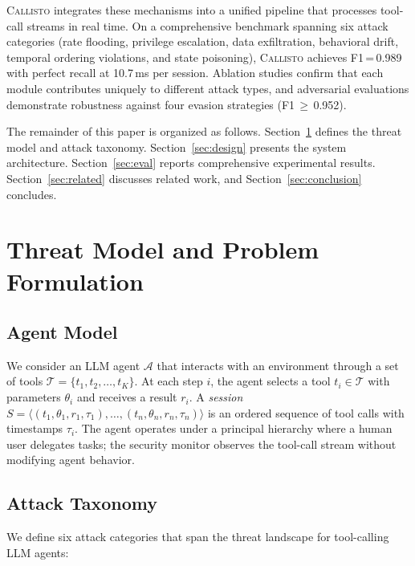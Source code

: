 \documentclass[conference,compsoc]{IEEEtran}
\newcommand{\system}{\textsc{Callisto}}
\begin{document}
\system{} integrates these mechanisms into a unified pipeline that processes tool-call streams in real time. On a comprehensive benchmark spanning six attack categories (rate flooding, privilege escalation, data exfiltration, behavioral drift, temporal ordering violations, and state poisoning), \system{} achieves F1\,=\,0.989 with perfect recall at 10.7\,ms per session. Ablation studies confirm that each module contributes uniquely to different attack types, and adversarial evaluations demonstrate robustness against four evasion strategies (F1\,$\geq$\,0.952).

The remainder of this paper is organized as follows. Section~\ref{sec:threat} defines the threat model and attack taxonomy. Section~\ref{sec:design} presents the system architecture. Section~\ref{sec:eval} reports comprehensive experimental results. Section~\ref{sec:related} discusses related work, and Section~\ref{sec:conclusion} concludes.

\section{Threat Model and Problem Formulation}
\label{sec:threat}

\subsection{Agent Model}

We consider an LLM agent $\mathcal{A}$ that interacts with an environment through a set of tools $\mathcal{T} = \{t_1, t_2, \ldots, t_K\}$. At each step $i$, the agent selects a tool $t_i \in \mathcal{T}$ with parameters $\theta_i$ and receives a result $r_i$. A \emph{session} $S = \langle (t_1, \theta_1, r_1, \tau_1), \ldots, (t_n, \theta_n, r_n, \tau_n) \rangle$ is an ordered sequence of tool calls with timestamps $\tau_i$. The agent operates under a principal hierarchy where a human user delegates tasks; the security monitor observes the tool-call stream without modifying agent behavior.

\subsection{Attack Taxonomy}

We define six attack categories that span the threat landscape for tool-calling LLM agents:
\end{document}
